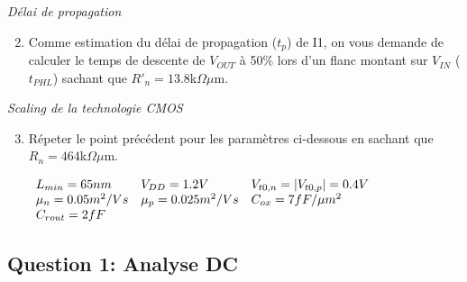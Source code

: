 \documentclass[frenchb,DIV=14]{scrartcl}
\begin{document}
\emph{Délai de propagation}
\begin{enumerate}
	\setcounter{enumi}{1}
	\item Comme estimation du délai de propagation ($t_p$) de I1, on vous demande de
	calculer le temps de descente de $V_{OUT}$ à 50\% lors d'un flanc montant sur $V_{IN}$
	($t_{PHL}$) sachant que $R'_n =13.8$k$\Omega\mu$m.
\end{enumerate}

\emph{Scaling de la technologie CMOS}
\begin{enumerate}
	\setcounter{enumi}{2}
	\item Répeter le point précédent pour les paramètres ci-dessous en sachant que
	$R_n = 464$k$\Omega\mu$m.

	\begin{center}
	$
		\begin{array}{l l l}
			L_{min} = 65 nm 		& V_{DD} = 1.2V 		&V_{t0,n} = |V_{t0,p}| = 0.4V \\
			\mu_n = 0.05 m^2/Vs 	& \mu_p= 0.025 m^2/Vs	& C_{ox} = 7 fF/\mu m^2 \\
			C_{rout} = 2fF			&						& \\
		\end{array}
	$
	\end{center}
\end{enumerate}

\subsection*{Question 1: Analyse DC}
\end{document}
